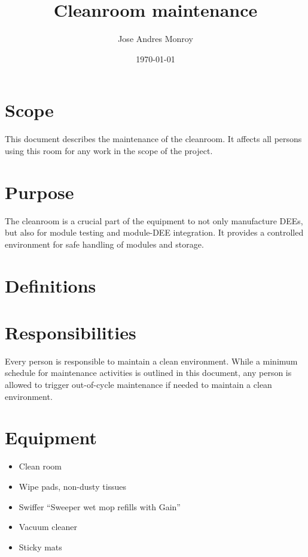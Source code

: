 \documentclass[12pt]{cornelltfpxsop}
\title{Cleanroom maintenance \newline}
\date{\today}
\author{Jose Andres Monroy}
\begin{document}
\maketitle

\section{Scope}
This document describes the maintenance of the cleanroom. It affects all persons using this room for any work in the scope of the project.

\section{Purpose}
The cleanroom is a crucial part of the equipment to not only manufacture DEEs, but also for module testing and module-DEE integration. It provides a controlled environment for safe handling of modules and storage.

\section{Definitions}

\section{Responsibilities}
Every person is responsible to maintain a clean environment. While a minimum schedule for maintenance activities is outlined in this document, any person is allowed to trigger out-of-cycle maintenance if needed to maintain a clean environment.

\section{Equipment}

\begin{itemize}
    \item Clean room
    \item Wipe pads, non-dusty tissues
    \item Swiffer ``Sweeper wet mop refills with Gain''
    \item Vacuum cleaner
    \item Sticky mats
\end{itemize}
\end{document}
